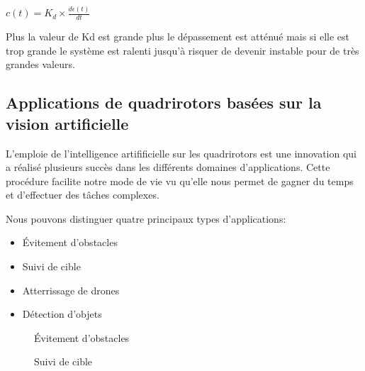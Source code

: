 $ c(t)  = K_d\times\frac{d\epsilon(t)}{dt}$


Plus la valeur de Kd est grande plus le dépassement est atténué mais si elle est trop grande le
système est ralenti jusqu'à risquer de devenir instable pour de très grandes valeurs.
\subsection{Applications de quadrirotors basées sur la vision artificielle}
L'emploie de l'intelligence artifificielle sur les quadrirotors est une innovation qui a réalisé plusieurs succès dans les différents domaines d'applications. Cette procédure facilite notre mode de vie vu qu'elle nous permet de gagner du temps et d'effectuer des tâches complexes.

Nous pouvons distinguer quatre principaux types d'applications:   
\begin{itemize}
	\item Évitement d'obstacles 
	\item Suivi de cible
	\item Atterrissage de drones 
	\item Détection d'objets 
\end{itemize}
\begin{figure}[H]
	\centering
	\begin{minipage}{0.49\textwidth}
		\caption{Évitement d'obstacles}
		
	\end{minipage}
	\begin{minipage}{0.49\textwidth}
		\caption{Suivi de cible}
	\end{minipage}
\end{figure}
